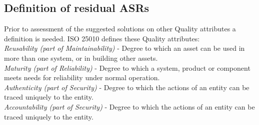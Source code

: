 \subsection{Definition of residual ASRs}
Prior to assessment of the suggested solutions on other Quality attributes a definition is needed. ISO 25010 \cite{ISO:25010:2011} defines these Quality attributes: \\
\textit{Reusability (part of Maintainability)} - Degree to which an asset can be used in more than one system, or in building other assets. \\
\textit{Maturity (part of Reliability)} - Degree to which a system, product or component meets needs for reliability under normal operation. \\
\textit{Authenticity (part of Security)} - Degree to which the actions of an entity can be traced uniquely to the entity. \\
\textit{Accountability (part of Security)} - Degree to which the actions of an entity can be traced uniquely to the entity. \\


